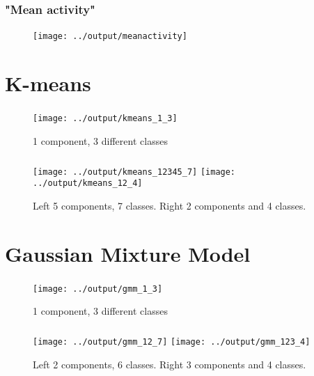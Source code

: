 \documentclass[12pt, english]{beamer}
\begin{document}
\begin{frame}
  \frametitle{"Mean activity"}
  \framesubtitle{}

\begin{figure}
\centering
\texttt{[image: ../output/meanactivity]}
    \caption*{}
    \label{fig:mean}
\end{figure}

\end{frame}

\section{K-means}
\begin{frame}
  \frametitle{}
  \framesubtitle{}

\begin{figure}
\centering
\texttt{[image: ../output/kmeans\_1\_3]}
  \caption*{1 component, 3 different classes}
    \label{fig:kmeams}
\end{figure}
\end{frame}

\begin{frame}
  \frametitle{}
  \framesubtitle{}

\begin{figure}
\centering
\texttt{[image: ../output/kmeans\_12345\_7]}
\texttt{[image: ../output/kmeans\_12\_4]}
\caption*{Left 5 components, 7 classes. Right 2 components and 4 classes.}
    \label{fig:kmeams2}
\end{figure}
\end{frame}

\section{Gaussian Mixture Model}
\begin{frame}
  \frametitle{}
  \framesubtitle{}

\begin{figure}
\centering
\texttt{[image: ../output/gmm\_1\_3]}
  \caption*{1 component, 3 different classes}
    \label{fig:gmm}
\end{figure}
\end{frame}

\begin{frame}
  \frametitle{}
  \framesubtitle{}

\begin{figure}
\centering
\texttt{[image: ../output/gmm\_12\_7]}
\texttt{[image: ../output/gmm\_123\_4]}
\caption*{Left 2 components, 6 classes. Right 3 components and 4 classes.}
    \label{fig:gmm2}
\end{figure}
\end{frame}
\end{document}
